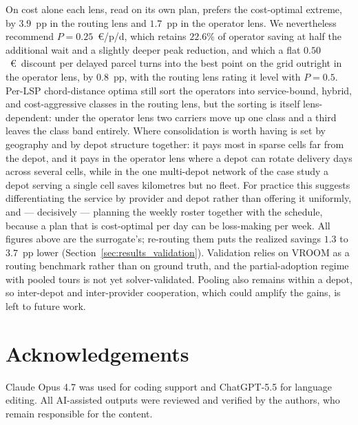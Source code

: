 \documentclass[preprint,12pt,authoryear]{elsarticle}
\begin{document}
On cost alone each lens, read on its own plan, prefers the cost-optimal extreme, by $3.9$~pp in the routing lens and $1.7$~pp in the operator lens. We nevertheless recommend $P = 0.25$~\euro/p/d, which retains $22.6\%$ of operator saving at half the additional wait and a slightly deeper peak reduction, and which a flat $0.50$~\euro\ discount per delayed parcel turns into the best point on the grid outright in the operator lens, by $0.8$~pp, with the routing lens rating it level with $P = 0.5$. Per-LSP chord-distance optima still sort the operators into service-bound, hybrid, and cost-aggressive classes in the routing lens, but the sorting is itself lens-dependent: under the operator lens two carriers move up one class and a third leaves the class band entirely. Where consolidation is worth having is set by geography and by depot structure together: it pays most in sparse cells far from the depot, and it pays in the operator lens where a depot can rotate delivery days across several cells, while in the one multi-depot network of the case study a depot serving a single cell saves kilometres but no fleet. For practice this suggests differentiating the service by provider and depot rather than offering it uniformly, and --- decisively --- planning the weekly roster together with the schedule, because a plan that is cost-optimal per day can be loss-making per week. All figures above are the surrogate's; re-routing them puts the realized savings $1.3$ to $3.7$~pp lower (Section~\ref{sec:results_validation}). Validation relies on VROOM as a routing benchmark rather than on ground truth, and the partial-adoption regime with pooled tours is not yet solver-validated. Pooling also remains within a depot, so inter-depot and inter-provider cooperation, which could amplify the gains, is left to future work.




\section*{Acknowledgements}

Claude Opus 4.7 was used for coding support and ChatGPT-5.5 for language editing. All AI-assisted outputs were reviewed and verified by the authors, who remain responsible for the content.





\end{document}
